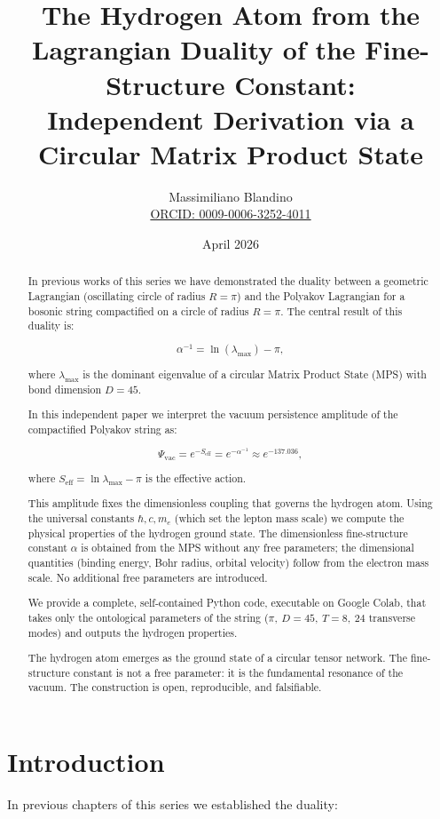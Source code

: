 \documentclass[12pt]{article}
\title{The Hydrogen Atom from the Lagrangian Duality of the Fine-Structure Constant: \\
Independent Derivation via a Circular Matrix Product State}
\author{Massimiliano Blandino \\ 
\href{https://orcid.org/0009-0006-3252-4011}{ORCID: 0009-0006-3252-4011}}
\date{April 2026}
\begin{document}
\maketitle

\begin{abstract}
In previous works of this series we have demonstrated the duality between a geometric Lagrangian (oscillating circle of radius \(R = \pi\)) and the Polyakov Lagrangian for a bosonic string compactified on a circle of radius \(R = \pi\). The central result of this duality is:

\[
\alpha^{-1} = \ln(\lambda_{\max}) - \pi, \tag{1}
\]

where \(\lambda_{\max}\) is the dominant eigenvalue of a circular Matrix Product State (MPS) with bond dimension \(D = 45\).

In this independent paper we interpret the vacuum persistence amplitude of the compactified Polyakov string as:

\[
\Psi_{\text{vac}} = e^{-S_{\text{eff}}} = e^{-\alpha^{-1}} \approx e^{-137.036}, \tag{2}
\]

where \(S_{\text{eff}} = \ln\lambda_{\max} - \pi\) is the effective action.

This amplitude fixes the dimensionless coupling that governs the hydrogen atom. Using the universal constants \(\hbar, c, m_e\) (which set the lepton mass scale) we compute the physical properties of the hydrogen ground state. The dimensionless fine-structure constant \(\alpha\) is obtained from the MPS without any free parameters; the dimensional quantities (binding energy, Bohr radius, orbital velocity) follow from the electron mass scale. No additional free parameters are introduced.

We provide a complete, self-contained Python code, executable on Google Colab, that takes only the ontological parameters of the string (\(\pi,\ D=45,\ T=8,\ 24\) transverse modes) and outputs the hydrogen properties.

The hydrogen atom emerges as the ground state of a circular tensor network. The fine-structure constant is not a free parameter: it is the fundamental resonance of the vacuum. The construction is open, reproducible, and falsifiable.
\end{abstract}

\section{Introduction}

In previous chapters of this series we established the duality:
\end{document}
